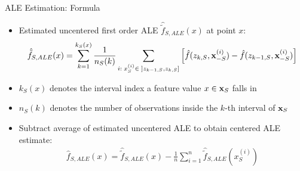 \documentclass[11pt,compress,t,notes=noshow, aspectratio=169, xcolor=table]{beamer}
\begin{document}
%
%
%
%
%
%
%
%
%
%
%
%
%
%
%
%
%
%
%
%

\begin{frame}{ALE Estimation: Formula}

\begin{itemize}
\item Estimated uncentered first order ALE $\hat{\tilde{f}}_{S, ALE}(x)$ at point $x$:
$$
\begin{aligned}
\hat{\tilde{f}}_{S, ALE}(x) = \sum_{k = 1}^{k_S(x)}\frac{1}{n_S(k)}\sum_{i: \; x_S^{(i)} \in \; ]z_{k-1, S}, z_{k, S}]}\left[\fh(z_{k, S}, \xi_{-S}) -\fh(z_{k-1, S}, \xi_{-S})\right]
\end{aligned}
$$
\item $k_S(x)$ denotes the interval index a feature value $x \in \xv_S$ falls in
\item $n_S(k)$ denotes the number of observations inside the $k$-th interval of $\xv_S$
\item Subtract average of estimated uncentered ALE to obtain centered ALE estimate: %
$$
\begin{aligned}
\hat{f}_{S, ALE}(x) = \hat{\tilde{f}}_{S, ALE}(x) - \frac{1}{n}\sum_{i = 1}^n \hat{\tilde{f}}_{S, ALE}(x_S^{(i)})
\end{aligned}
$$

\end{itemize}
\end{frame}
\end{document}
